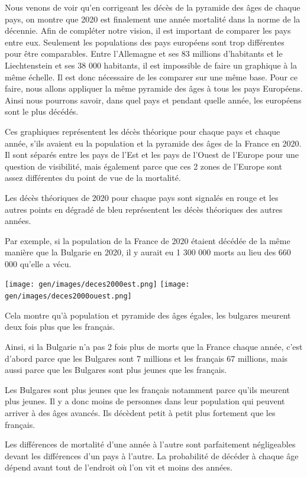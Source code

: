 \documentclass[
]{article}
\begin{document}
Nous venons de voir qu'en corrigeant les décès de la pyramide des âges
de chaque pays, on montre que 2020 est finalement une année mortalité
dans la norme de la décennie. Afin de compléter notre vision, il est
important de comparer les pays entre eux. Seulement les populations des
pays européens sont trop différentes pour être comparables. Entre
l'Allemagne et ses 83 millions d'habitants et le Liechtenstein et ses 38
000 habitants, il est impossible de faire un graphique à la même
échelle. Il est donc nécessaire de les comparer sur une même base. Pour
ce faire, nous allons appliquer la même pyramide des âges à tous les
pays Européens. Ainsi nous pourrons savoir, dans quel pays et pendant
quelle année, les européens sont le plus décédés.

Ces graphiques représentent les décès théorique pour chaque pays et
chaque année, s'ils avaient eu la population et la pyramide des âges de
la France en 2020. Il sont séparés entre les pays de l'Est et les pays
de l'Ouest de l'Europe pour une question de visibilité, mais également
parce que ces 2 zones de l'Europe sont assez différentes du point de vue
de la mortalité.

Les décès théoriques de 2020 pour chaque pays sont signalés en rouge et
les autres points en dégradé de bleu représentent les décès théoriques
des autres années.

Par exemple, si la population de la France de 2020 étaient décédée de la
même manière que la Bulgarie en 2020, il y aurait eu 1 300 000 morts au
lieu des 660 000 qu'elle a vécu.

\texttt{[image: gen/images/deces2000est.png]}
\texttt{[image: gen/images/deces2000ouest.png]}

Cela montre qu'à population et pyramide des âges égales, les bulgares
meurent deux fois plus que les français.

Ainsi, si la Bulgarie n'a pas 2 fois plus de morts que la France chaque
année, c'est d'abord parce que les Bulgares sont 7 millions et les
français 67 millions, mais aussi parce que les Bulgares sont plus jeunes
que les français.

Les Bulgares sont plus jeunes que les français notamment parce qu'ils
meurent plus jeunes. Il y a donc moins de personnes dans leur population
qui peuvent arriver à des âges avancés. Ils décèdent petit à petit plus
fortement que les français.

Les différences de mortalité d'une année à l'autre sont parfaitement
négligeables devant les différences d'un pays à l'autre. La probabilité
de décéder à chaque âge dépend avant tout de l'endroit où l'on vit et
moins des années.
\end{document}
